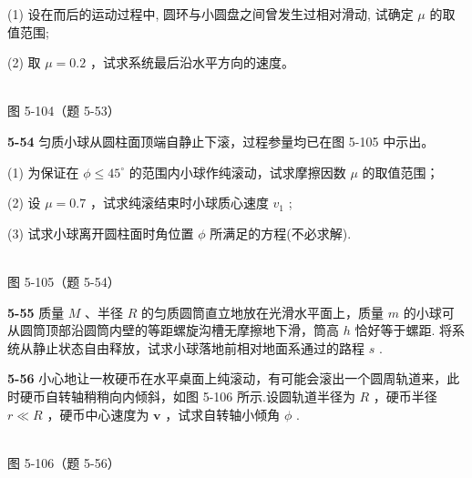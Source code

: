 (1) 设在而后的运动过程中, 圆环与小圆盘之间曾发生过相对滑动, 试确定 $\mu$ 的取值范围;

(2) 取 $\mu=0.2$ ，试求系统最后沿水平方向的速度。

\begin{center}
\resizebox{0.50\textwidth}{!}{}\\[4pt]
{\small 图 5-104（题 5-53）}
\end{center}

\newpage

\textbf{5-54} 匀质小球从圆柱面顶端自静止下滚，过程参量均已在图 5-105 中示出。

(1) 为保证在 $\phi \leqslant 45^{\circ}$ 的范围内小球作纯滚动，试求摩擦因数 $\mu$ 的取值范围；

(2) 设 $\mu=0.7$ ，试求纯滚结束时小球质心速度 $v_{1}$ ;

(3) 试求小球离开圆柱面时角位置 $\phi$ 所满足的方程(不必求解).

\begin{center}
\resizebox{0.42\textwidth}{!}{}\\[4pt]
{\small 图 5-105（题 5-54）}
\end{center}

\newpage

\textbf{5-55} 质量 $M$ 、半径 $R$ 的匀质圆筒直立地放在光滑水平面上，质量 $m$ 的小球可从圆筒顶部沿圆筒内壁的等距螺旋沟槽无摩擦地下滑，筒高 $h$ 恰好等于螺距. 将系统从静止状态自由释放，试求小球落地前相对地面系通过的路程 $s$ .

\newpage

\textbf{5-56} 小心地让一枚硬币在水平桌面上纯滚动，有可能会滚出一个圆周轨道来，此时硬币自转轴稍稍向内倾斜，如图 5-106 所示.设圆轨道半径为 $R$ ，硬币半径 $r\ll R$ ，硬币中心速度为 $\pmb{v}$ ，试求自转轴小倾角 $\phi$ .

\begin{center}
\resizebox{0.50\textwidth}{!}{}\\[4pt]
{\small 图 5-106（题 5-56）}
\end{center}

